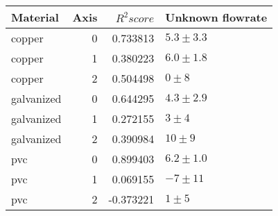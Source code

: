 \begin{tabular}{lrrl}
\toprule
\textbf{Material} & \textbf{Axis} & \textbf{$R^2 score$} & \textbf{Unknown flowrate} \\
\midrule
copper & 0 & 0.733813 & $5.3 \pm 3.3$ \\
copper & 1 & 0.380223 & $6.0 \pm 1.8$ \\
copper & 2 & 0.504498 & $0 \pm 8$ \\
galvanized & 0 & 0.644295 & $4.3 \pm 2.9$ \\
galvanized & 1 & 0.272155 & $3 \pm 4$ \\
galvanized & 2 & 0.390984 & $10 \pm 9$ \\
pvc & 0 & 0.899403 & $6.2 \pm 1.0$ \\
pvc & 1 & 0.069155 & $-7 \pm 11$ \\
pvc & 2 & -0.373221 & $1 \pm 5$ \\
\bottomrule
\end{tabular}
